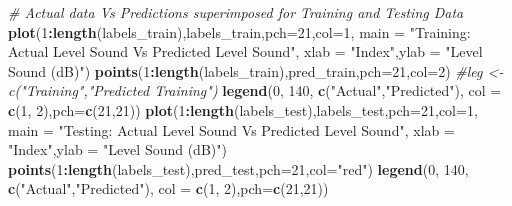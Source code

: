 \documentclass[]{article}
\newenvironment{Shaded}{\begin{snugshade}}{\end{snugshade}}
\newcommand{\KeywordTok}[1]{\textcolor[rgb]{0.13,0.29,0.53}{\textbf{#1}}}
\newcommand{\DataTypeTok}[1]{\textcolor[rgb]{0.13,0.29,0.53}{#1}}
\newcommand{\DecValTok}[1]{\textcolor[rgb]{0.00,0.00,0.81}{#1}}
\newcommand{\StringTok}[1]{\textcolor[rgb]{0.31,0.60,0.02}{#1}}
\newcommand{\CommentTok}[1]{\textcolor[rgb]{0.56,0.35,0.01}{\textit{#1}}}
\newcommand{\OperatorTok}[1]{\textcolor[rgb]{0.81,0.36,0.00}{\textbf{#1}}}
\newcommand{\NormalTok}[1]{#1}
\begin{document}
\begin{Shaded}
\begin{Highlighting}[]
{{{        \CommentTok{# Actual data Vs Predictions superimposed for Training and Testing Data}
        \KeywordTok{plot}\NormalTok{(}\DecValTok{1}\OperatorTok{:}\KeywordTok{length}\NormalTok{(labels_train),labels_train,}\DataTypeTok{pch=}\DecValTok{21}\NormalTok{,}\DataTypeTok{col=}\DecValTok{1}\NormalTok{,}
             \DataTypeTok{main =} \StringTok{"Training: Actual Level Sound Vs Predicted Level Sound"}\NormalTok{,}
             \DataTypeTok{xlab =} \StringTok{"Index"}\NormalTok{,}\DataTypeTok{ylab =} \StringTok{"Level Sound (dB)"}\NormalTok{)}
        \KeywordTok{points}\NormalTok{(}\DecValTok{1}\OperatorTok{:}\KeywordTok{length}\NormalTok{(labels_train),pred_train,}\DataTypeTok{pch=}\DecValTok{21}\NormalTok{,}\DataTypeTok{col=}\DecValTok{2}\NormalTok{)}
        \CommentTok{#leg <- c("Training","Predicted Training")}
        \KeywordTok{legend}\NormalTok{(}\DecValTok{0}\NormalTok{, }\DecValTok{140}\NormalTok{, }\KeywordTok{c}\NormalTok{(}\StringTok{"Actual"}\NormalTok{,}\StringTok{"Predicted"}\NormalTok{), }\DataTypeTok{col =} \KeywordTok{c}\NormalTok{(}\DecValTok{1}\NormalTok{, }\DecValTok{2}\NormalTok{),}\DataTypeTok{pch=}\KeywordTok{c}\NormalTok{(}\DecValTok{21}\NormalTok{,}\DecValTok{21}\NormalTok{))}
        \KeywordTok{plot}\NormalTok{(}\DecValTok{1}\OperatorTok{:}\KeywordTok{length}\NormalTok{(labels_test),labels_test,}\DataTypeTok{pch=}\DecValTok{21}\NormalTok{,}\DataTypeTok{col=}\DecValTok{1}\NormalTok{,}
             \DataTypeTok{main =} \StringTok{"Testing: Actual Level Sound Vs Predicted Level Sound"}\NormalTok{,}
             \DataTypeTok{xlab =} \StringTok{"Index"}\NormalTok{,}\DataTypeTok{ylab =} \StringTok{"Level Sound (dB)"}\NormalTok{)}
        \KeywordTok{points}\NormalTok{(}\DecValTok{1}\OperatorTok{:}\KeywordTok{length}\NormalTok{(labels_test),pred_test,}\DataTypeTok{pch=}\DecValTok{21}\NormalTok{,}\DataTypeTok{col=}\StringTok{"red"}\NormalTok{)}
        \KeywordTok{legend}\NormalTok{(}\DecValTok{0}\NormalTok{, }\DecValTok{140}\NormalTok{, }\KeywordTok{c}\NormalTok{(}\StringTok{"Actual"}\NormalTok{,}\StringTok{"Predicted"}\NormalTok{), }\DataTypeTok{col =} \KeywordTok{c}\NormalTok{(}\DecValTok{1}\NormalTok{, }\DecValTok{2}\NormalTok{),}\DataTypeTok{pch=}\KeywordTok{c}\NormalTok{(}\DecValTok{21}\NormalTok{,}\DecValTok{21}\NormalTok{))}
        
}}}
\end{Highlighting}
\end{Shaded}
\end{document}
